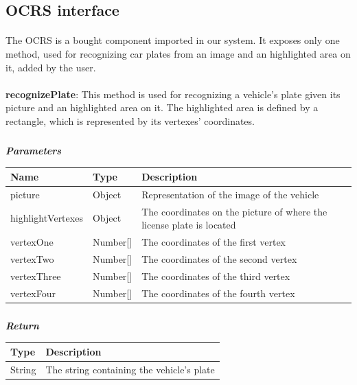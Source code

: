 			\subsection{OCRS interface}
				\paragraph{}
					The OCRS is a bought component imported in our system. It exposes only one method, used for recognizing car plates from an image and an highlighted area on it, added by the user.
					
					\paragraph{}
							\textbf{recognizePlate}: This method is used for recognizing a vehicle's plate given its picture and an highlighted area on it. The highlighted area is defined by a rectangle, which is represented by its vertexes' coordinates. 
							\subparagraph{}
							\textit{\textbf{Parameters}}
								\begin{table}[!h]
									\begin{tabular}{L{0.2\textwidth}L{0.2\textwidth}L{0.2\textwidth}}
										\toprule
										Name & Type & Description \\
										\midrule
								  		picture & Object & Representation of the image of the vehicle \\
								  		highlightVertexes & Object & The coordinates on the picture of where the license plate is located \\
								  		\hspace{2.5mm}vertexOne & Number[] & The coordinates of the first vertex \\
								  		\hspace{2.5mm}vertexTwo & Number[] & The coordinates of the second vertex \\
								  		\hspace{2.5mm}vertexThree & Number[] & The coordinates of the third vertex \\
								  		\hspace{2.5mm}vertexFour & Number[] & The coordinates of the fourth vertex \\
								 		\bottomrule
									\end{tabular}
								\end{table}
							\subparagraph{}
								\textit{\textbf{Return}}
									\begin{table}[!h]
									\begin{tabular}{L{0.3\textwidth}L{0.3\textwidth}}
										\toprule
										Type & Description \\
										\midrule
								  		String & The string containing the vehicle's plate \\
								 		\bottomrule
									\end{tabular}
								\end{table}
